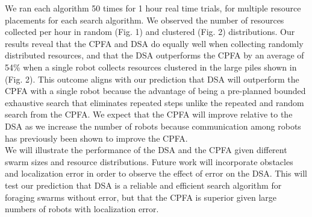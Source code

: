 \documentclass[10pt]{article}
\begin{document}
\begin{figure}[!h]
		  \vspace{-2pt}
          \begin{floatrow}
            \vspace{-2pt}
          \end{floatrow}
       \end{figure}\vspace{-12pt}


\vspace{10pt}
We ran each algorithm 50 times for 1 hour real time trials, for multiple resource placements for each search algorithm. We observed the number of resources collected per hour in random (Fig. 1) and clustered (Fig. 2) distributions. Our results reveal that the CPFA and DSA do equally well when collecting randomly distributed resources, and that the DSA outperforms the CPFA by an average of 54\% when a single robot collects resources clustered in the large piles shown in (Fig. 2). 
\noindent This outcome aligns with our prediction that DSA will outperform the CPFA with a single robot because the advantage of being a pre-planned bounded exhaustive search that eliminates repeated steps unlike the repeated and random search from the CPFA. We expect that the CPFA will improve relative to the DSA as we increase the number of robots because communication among robots has previously been shown to improve the CPFA.  \\
We will illustrate the performance of the DSA and the CPFA  given different swarm sizes and resource distributions. Future work will incorporate obstacles and localization error in order to observe the effect of error on the DSA. This will test our prediction that DSA is a reliable and efficient search algorithm for foraging swarms without error, but that the CPFA is superior given large numbers of robots with localization error.

\noindent
\vspace{-5pt}
\renewcommand\refname{} 
\vspace*{-1.5cm}
\begingroup
\endgroup
\end{document}
